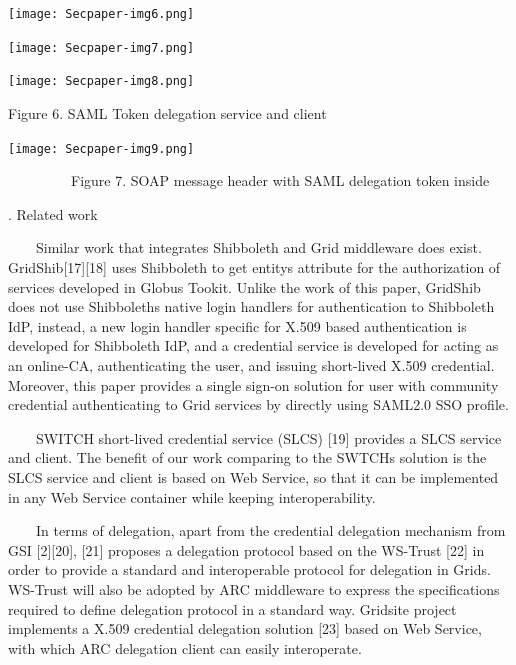 \documentclass{article}
\begin{document}
\bigskip



\begin{center}
\texttt{[image: Secpaper-img6.png]}
\end{center}
\begin{center}
\texttt{[image: Secpaper-img7.png]}
\end{center}
\begin{center}
\texttt{[image: Secpaper-img8.png]}
\end{center}
{\centering
Figure 6. SAML Token delegation service and client
\par}


\bigskip


\bigskip


\bigskip



\begin{center}
\texttt{[image: Secpaper-img9.png]}
\end{center}
{\centering
\ \ \ \ \ \ \ \ \ Figure 7. SOAP message header with SAML delegation
token inside
\par}


\bigskip

{. Related work
\par}

\ \ \ \ Similar work that integrates Shibboleth and Grid middleware does
exist. GridShib[17][18] uses Shibboleth to get
entity{\textquotesingle}s attribute for the authorization of services
developed in Globus Tookit. Unlike the work of this paper, GridShib
does not use Shibboleth{\textquotesingle}s native login handlers for
authentication to Shibboleth IdP, instead, a new login handler specific
for X.509 based authentication is developed for Shibboleth IdP, and a
credential service is developed for acting as an online-CA,
authenticating the user, and issuing short-lived X.509 credential.
Moreover, this paper provides a single sign-on solution for user with
community credential authenticating to Grid services by directly using
SAML2.0 SSO profile.

\ \ \ \ SWITCH short-lived credential service (SLCS) [19] provides a
SLCS service and client. The benefit of our work comparing to the
SWTCH{\textquotesingle}s solution is the SLCS service and client is
based on Web Service, so that it can be implemented in any Web Service
container while keeping interoperability.

\ \ \ \ In terms of delegation, apart from the credential delegation
mechanism from GSI [2][20], [21] proposes a delegation protocol based
on the WS-Trust [22] in order to provide a standard and interoperable
protocol for delegation in Grids. WS-Trust will also be adopted by ARC
middleware to express the specifications required to define delegation
protocol in a standard way. Gridsite project implements a X.509
credential delegation solution [23] based on Web Service, with which
ARC delegation client can easily interoperate.
\end{document}
